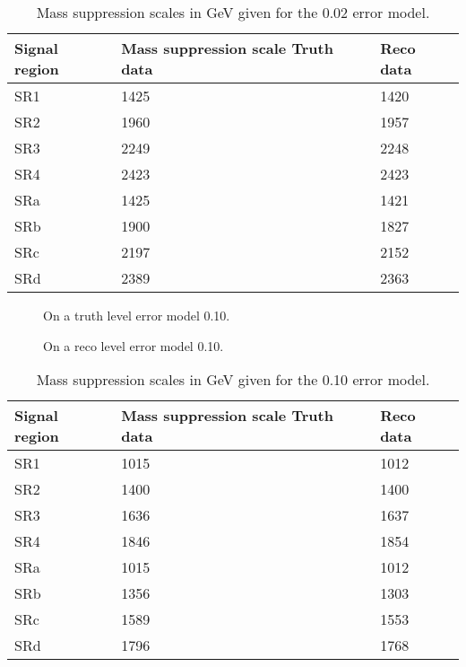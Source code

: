 \begin{table}[ht]
\begin{center}
\begin{tabular}{|l|l|l|}
\hline
Signal region & Mass suppression scale Truth data & Reco data \\ \hline
SR1&1425&1420\\
SR2&1960&1957\\
SR3&2249&2248\\
SR4&2423&2423\\ \hline
SRa&1425&1421\\
SRb&1900&1827\\
SRc&2197&2152\\
SRd&2389&2363\\ \hline
\end{tabular}
\caption{Mass suppression scales in GeV given for the 0.02 error model.}
\label{tab:masssupp002}
\end{center}
\end{table}

 \begin{figure}[H] %
    \hfill
    \caption{On a truth level error model 0.10.}
    \label{fig:SRnewM2t}
  \end{figure}

 \begin{figure}[H] %
    \hfill
    \caption{On a reco level error model 0.10.}
    \label{fig:SRnewM2r}
  \end{figure}

\begin{table}[ht]
\begin{center}
\begin{tabular}{|l|l|l|}
\hline
Signal region & Mass suppression scale Truth data & Reco data \\ \hline
SR1&1015&1012\\
SR2&1400&1400\\
SR3&1636&1637\\
SR4&1846&1854\\ \hline
SRa&1015&1012\\
SRb&1356&1303\\
SRc&1589&1553\\
SRd&1796&1768\\ \hline
\end{tabular}
\caption{Mass suppression scales in GeV given for the 0.10 error model.}
\label{tab:masssupp010}
\end{center}
\end{table}

